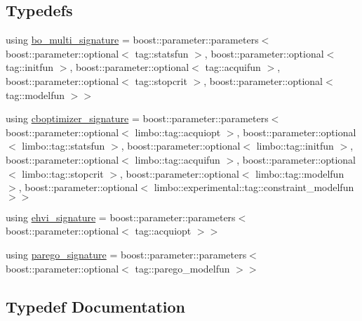 \subsection*{Typedefs}
\begin{DoxyCompactItemize}
\item 
using \hyperlink{namespacelimbo_1_1experimental_1_1bayes__opt_a571329d2f0470956331c4fbdf32a2a6f}{bo\+\_\+multi\+\_\+signature} = boost\+::parameter\+::parameters$<$ boost\+::parameter\+::optional$<$ tag\+::statsfun $>$, boost\+::parameter\+::optional$<$ tag\+::initfun $>$, boost\+::parameter\+::optional$<$ tag\+::acquifun $>$, boost\+::parameter\+::optional$<$ tag\+::stopcrit $>$, boost\+::parameter\+::optional$<$ tag\+::modelfun $>$$>$
\item 
using \hyperlink{namespacelimbo_1_1experimental_1_1bayes__opt_ae227a617e3c612fe31b87959b23da719}{cboptimizer\+\_\+signature} = boost\+::parameter\+::parameters$<$ boost\+::parameter\+::optional$<$ limbo\+::tag\+::acquiopt $>$, boost\+::parameter\+::optional$<$ limbo\+::tag\+::statsfun $>$, boost\+::parameter\+::optional$<$ limbo\+::tag\+::initfun $>$, boost\+::parameter\+::optional$<$ limbo\+::tag\+::acquifun $>$, boost\+::parameter\+::optional$<$ limbo\+::tag\+::stopcrit $>$, boost\+::parameter\+::optional$<$ limbo\+::tag\+::modelfun $>$, boost\+::parameter\+::optional$<$ limbo\+::experimental\+::tag\+::constraint\+\_\+modelfun $>$$>$
\item 
using \hyperlink{namespacelimbo_1_1experimental_1_1bayes__opt_ae8eff4654db4ec2db25b12dcb2a18b52}{ehvi\+\_\+signature} = boost\+::parameter\+::parameters$<$ boost\+::parameter\+::optional$<$ tag\+::acquiopt $>$$>$
\item 
using \hyperlink{namespacelimbo_1_1experimental_1_1bayes__opt_acbfe5ad9b42be948de5ebb46bdc9dd01}{parego\+\_\+signature} = boost\+::parameter\+::parameters$<$ boost\+::parameter\+::optional$<$ tag\+::parego\+\_\+modelfun $>$$>$
\end{DoxyCompactItemize}


\subsection{Typedef Documentation}
\hypertarget{namespacelimbo_1_1experimental_1_1bayes__opt_a571329d2f0470956331c4fbdf32a2a6f}{}
